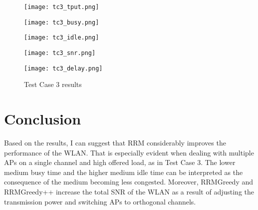 \begin{figure}[!ht]
    \centering
    \begin{minipage}[b]{0.48\textwidth}
        \centering
        \texttt{[image: tc3\_tput.png]}
        \label{fig:tc3:tput}
    \end{minipage}
    \hfill
    \begin{minipage}[b]{0.48\textwidth}
        \centering
        \texttt{[image: tc3\_busy.png]}
        \label{fig:tc3:busy}
    \end{minipage}
    
    \vspace{0.1em}
    
    \begin{minipage}[b]{0.48\textwidth}
        \centering
        \texttt{[image: tc3\_idle.png]}
        \label{fig:tc3:idle}
    \end{minipage}
    \hfill
    \begin{minipage}[b]{0.48\textwidth}
        \centering
        \texttt{[image: tc3\_snr.png]}
        \label{fig:tc3:snr}
    \end{minipage}
    
    \vspace{0.1em}
    
    \begin{minipage}[b]{0.48\textwidth}
        \centering
        \texttt{[image: tc3\_delay.png]}
        \label{fig:tc3:l3delay}
    \end{minipage}
    
    \caption{Test Case 3 results}
    \label{fig:tc3:plots}
\end{figure}


\section{Conclusion}
\label{chap:impl:sec:conclusion}

Based on the results, I can suggest that RRM considerably improves the performance of the WLAN. That is especially evident when dealing with multiple APs on a single channel and high offered load, as in Test Case 3. The lower medium busy time and the higher medium idle time can be interpreted as the consequence of the medium becoming less congested. Moreover, RRMGreedy and RRMGreedy++ increase the total SNR of the WLAN as a result of adjusting the transmission power and switching APs to orthogonal channels.


